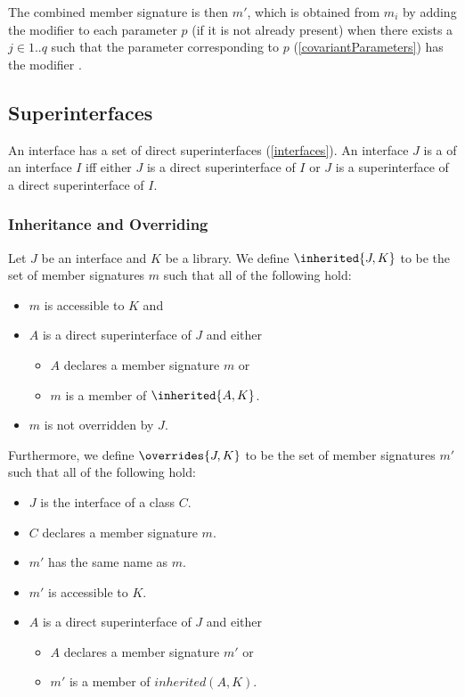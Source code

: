 \documentclass[makeidx]{article}
\begin{document}
\LMHash{}
The combined member signature is then $m'$,
which is obtained from $m_i$ by adding the modifier \COVARIANT{}
to each parameter $p$ (if it is not already present)
when there exists a $j \in 1 .. q$
such that the parameter corresponding to $p$
(\ref{covariantParameters})
has the modifier \COVARIANT{}.


\subsection{Superinterfaces}

\LMHash{}%
An interface has a set of direct superinterfaces
(\ref{interfaces}).
An interface $J$ is a  of an interface $I$
if{}f either $J$ is a direct superinterface of $I$
or $J$ is a superinterface of a direct superinterface of $I$.


\subsubsection{Inheritance and Overriding}

\LMHash{}%
Let $J$ be an interface and $K$ be a library.
We define $\inherited{J, K}$ to be the set of member signatures $m$
such that all of the following hold:
\begin{itemize}
\item $m$ is accessible to $K$ and
\item $A$ is a direct superinterface of $J$ and either
  \begin{itemize}
  \item $A$ declares a member signature $m$ or
  \item $m$ is a member of $\inherited{A, K}$.
  \end{itemize}
\item $m$ is not overridden by $J$.
\end{itemize}

\LMHash{}%
Furthermore, we define $\overrides{J, K}$ to be
the set of member signatures $m'$
such that all of the following hold:
\begin{itemize}
\item $J$ is the interface of a class $C$.
\item $C$ declares a member signature $m$.
\item $m'$ has the same name as $m$.
\item $m'$ is accessible to $K$.
\item $A$ is a direct superinterface of $J$ and either
  \begin{itemize}
  \item $A$ declares a member signature $m'$ or
  \item $m'$ is a member of $inherited(A, K)$.
  \end{itemize}
\end{itemize}
\end{document}
